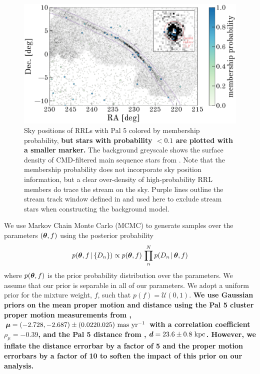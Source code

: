 \documentclass[twocolumn]{aastex63}
\newcommand{\changes}[1]{{\textbf{#1}}}
\begin{document}
\begin{figure}[t]
\begin{center}
\includegraphics[width=\textwidth]{members.pdf}
\caption{Sky positions of RRLs with Pal 5 colored by membership probability, \changes{but stars with probability $<0.1$ are plotted with a smaller marker.}
The background greyscale shows the surface density of CMD-filtered main sequence stars from \citet{Bonaca:2019}.
Note that the membership probability does not incorporate sky position information, but a clear over-density of high-probability RRL members do trace the stream on the sky.
Purple lines outline the stream track window defined in \citet{Bonaca:2019} and used here to exclude stream stars when constructing the background model.}
\label{fig:members}
\end{center}
\end{figure}

We use Markov Chain Monte Carlo (MCMC) to generate samples over the parameters $(\boldsymbol{\theta}, f)$ using the posterior probability
\begin{equation}
    p(\bs{\theta}, f \given \{D_n\}) \propto p(\bs{\theta}, f) \, \prod_n^N p(D_n \given \bs{\theta}, f)
\end{equation}
where $p(\boldsymbol{\theta}, f)$ is the prior probability distribution over the parameters.
We assume that our prior is separable in all of our parameters.
We adopt a uniform prior for the mixture weight, $f$, such that $p(f) = \mathcal{U}(0, 1)$.
\changes{We use Gaussian priors on the mean proper motion and distance using the Pal 5 cluster proper motion measurements from \citet{Vasiliev:2019}, $\boldsymbol{\mu} = (-2.728, -2.687) \pm (0.022	0.025)~\mathrm{mas}~\mathrm{yr}^{-1}$ with a correlation coefficient $\rho_\mu = -0.39$, and the Pal 5 distance from \citet{Kuepper:2015}, $\boldsymbol{d} = 23.6 \pm 0.8~\mathrm{kpc}$.
However, we inflate the distance errorbar by a factor of 5 and the proper motion errorbars by a factor of 10 to soften the impact of this prior on our analysis.}
\end{document}
